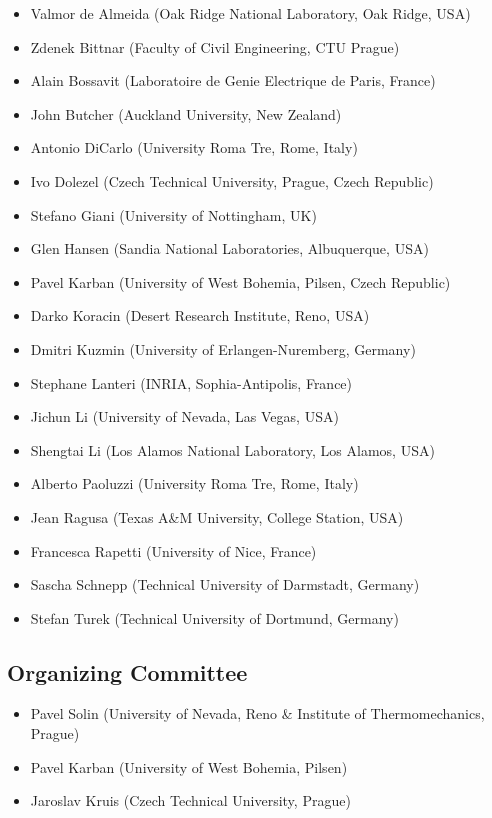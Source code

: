 \documentclass[article,A4,11pt]{llncs}%
\begin{document}
\begin{itemize}
\item Valmor de Almeida (Oak Ridge National Laboratory, Oak Ridge, USA)
\item Zdenek Bittnar (Faculty of Civil Engineering, CTU Prague)
\item Alain Bossavit (Laboratoire de Genie Electrique de Paris, France)
\item John Butcher (Auckland University, New Zealand)
\item Antonio DiCarlo (University Roma Tre, Rome, Italy)
\item Ivo Dolezel (Czech Technical University, Prague, Czech Republic)
\item Stefano Giani (University of Nottingham, UK)
\item Glen Hansen (Sandia National Laboratories, Albuquerque, USA)
\item Pavel Karban (University of West Bohemia, Pilsen, Czech Republic)
\item Darko Koracin (Desert Research Institute, Reno, USA)
\item Dmitri Kuzmin (University of Erlangen-Nuremberg, Germany)
\item Stephane Lanteri (INRIA, Sophia-Antipolis, France)
\item Jichun Li (University of Nevada, Las Vegas, USA)
\item Shengtai Li (Los Alamos National Laboratory, Los Alamos, USA)
\item Alberto Paoluzzi (University Roma Tre, Rome, Italy)
\item Jean Ragusa (Texas A\&M University, College Station, USA)
\item Francesca Rapetti (University of Nice, France)
\item Sascha Schnepp (Technical University of Darmstadt, Germany)
\item Stefan Turek (Technical University of Dortmund, Germany)
\end{itemize}

\subsection*{Organizing Committee}

\begin{itemize}
\item Pavel Solin (University of Nevada, Reno \& Institute of Thermomechanics, Prague)
\item Pavel Karban  (University of West Bohemia, Pilsen)
\item Jaroslav Kruis (Czech Technical University, Prague)
\end{itemize}
\end{document}
